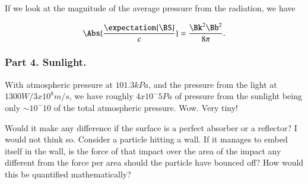 If we look at the magnitude of the average pressure from the radiation, we have

\begin{equation}\label{eqn:relElectroDynProblemSet4:354}
\Abs{\frac{\expectation{\BS}}{c}} = \frac{\Bk^2 \Bb^2 }{8 \pi}.
\end{equation}

\subsubsection{Part 4.  Sunlight.}

With atmospheric pressure at $101.3 k Pa$, and the pressure from the light at $1300 W/ 3 x 10^8 m/s$, we have roughly $4 x 10^-5 Pa$ of pressure from the sunlight being only $\sim 10^-{10}$ of the total atmospheric pressure.  Wow.  Very tiny!

Would it make any difference if the surface is a perfect absorber or a reflector?  I would not think so.  Consider a particle hitting a wall.  If it manages to embed itself in the wall, is the force of that impact over the area of the impact any different from the force per area should the particle have bounced off?  How would this be quantified mathematically?



\EndArticle
